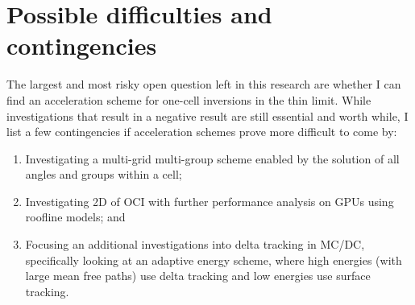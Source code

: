 \section{Possible difficulties and contingencies}
The largest and most risky open question left in this research are whether I can find an acceleration scheme for one-cell inversions in the thin limit.
While investigations that result in a negative result are still essential and worth while, I list a few contingencies if acceleration schemes prove more difficult to come by:
\begin{enumerate}
    \item Investigating a multi-grid multi-group scheme enabled by the solution of all angles and groups within a cell;
    \item Investigating 2D of OCI with further performance analysis on GPUs using roofline models; and
    \item Focusing an additional investigations into delta tracking in MC/DC, specifically looking at an adaptive energy scheme, where high energies (with large mean free paths) use delta tracking and low energies use surface tracking.
\end{enumerate}

